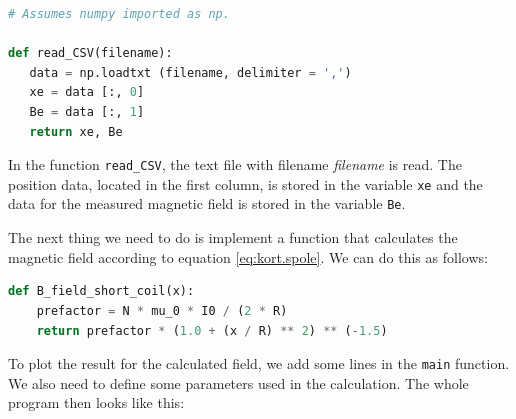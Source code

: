 \documentclass[../Elmag-labhefte-2020.tex]{subfiles}
\begin{document}
\begin{lstlisting}[language=python]
# Assumes numpy imported as np.
  
def read_CSV(filename):
   data = np.loadtxt (filename, delimiter = ',')
   xe = data [:, 0]
   Be = data [:, 1]
   return xe, Be
\end{lstlisting}
In the function \texttt{read\_CSV}, the text file with filename \emph{filename} is read. The position data, located in the first column, is stored in the variable \texttt{xe} and the data for the measured magnetic field is stored in the variable \texttt{Be}.

The next thing we need to do is implement a function that calculates the magnetic field according to equation \eqref{eq:kort.spole}. We can do this as follows:

\begin{lstlisting}[language=python]
def B_field_short_coil(x):
    prefactor = N * mu_0 * I0 / (2 * R)
    return prefactor * (1.0 + (x / R) ** 2) ** (-1.5)
\end{lstlisting}
To plot the result for the calculated field, we add some lines in the \texttt{main} function. We also need to define some parameters used in the calculation. The whole program then looks like this:
\end{document}
